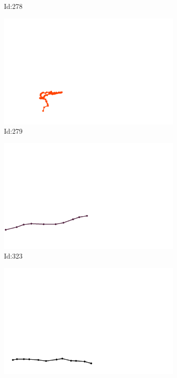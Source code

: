 \documentclass[12pt,twoside]{report}
\begin{document}
\begin{figure}
\begin{subfigure}[b]{0.20\textwidth}
\caption{Id:278}
\end{subfigure}
\begin{subfigure}[b]{0.20\textwidth}
\centering
\includegraphics[width=\textwidth]{../trajectories/279.png}
\caption{Id:279}
\end{subfigure}
\begin{subfigure}[b]{0.20\textwidth}
\centering
\includegraphics[width=\textwidth]{../trajectories/323.png}
\caption{Id:323}
\end{subfigure}
\begin{subfigure}[b]{0.20\textwidth}
\centering
\includegraphics[width=\textwidth]{../trajectories/350.png}

\end{subfigure}
\end{figure}
\end{document}
